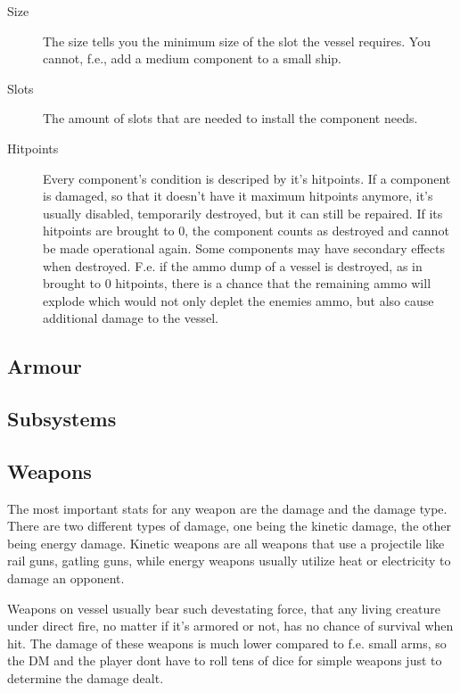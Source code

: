 \begin{description}
  \item[Size] The size tells you the minimum size of the slot the vessel requires. You cannot, f.e., add a medium component to a small ship.
  \item[Slots] The amount of slots that are needed to install the component needs.
  \item[Hitpoints] Every component's condition is descriped by it's hitpoints. If a component is damaged, so that it doesn't have it maximum hitpoints anymore, it's usually disabled, temporarily destroyed, but it can still be repaired. If its hitpoints are brought to 0, the component counts as destroyed and cannot be made operational again. Some components may have secondary effects when destroyed. F.e. if the ammo dump of a vessel is destroyed, as in brought to 0 hitpoints, there is a chance that the remaining ammo will explode which would not only deplet the enemies ammo, but also cause additional damage to the vessel.
\end{description}

\subsection{Armour}
\label{sub:Vessel-Armour}

\subsection{Subsystems}
\label{sub:Vessel-Subsystems}

\subsection{Weapons}
\label{sub:Vessel-Weapons}

The most important stats for any weapon are the damage and the damage type. There are two different types of damage, one being the kinetic damage, the other being energy damage. Kinetic weapons are all weapons that use a projectile like rail guns, gatling guns, while energy weapons usually utilize heat or electricity to damage an opponent.

Weapons on vessel usually bear such devestating force, that any living creature under direct fire, no matter if it's armored or not, has no chance of survival when hit. The damage of these weapons is much lower compared to f.e. small arms, so the DM and the player dont have to roll tens of dice for simple weapons just to determine the damage dealt.

